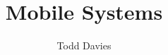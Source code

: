 \newcommand{\coursename}{Mobile Systems}
\newcommand{\coursecode}{28512}
\newcommand{\courseinfo}{}
\newcommand{\Author}{Todd Davies} 
\newcommand{\Title}{Mobile Systems}
\author{\Author}
\title{\Title}